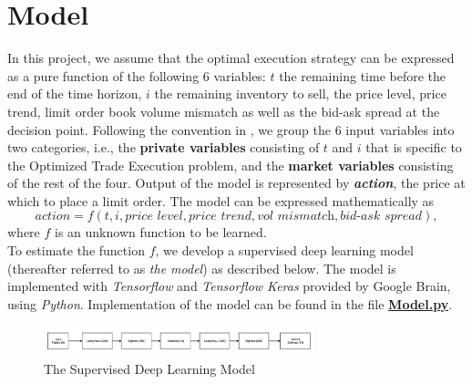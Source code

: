 \documentclass[12pt]{extarticle}
\begin{document}
\section{Model}
In this project, we assume that the optimal execution strategy can be expressed as
a pure function of the following 6 variables: $t$ the remaining time before the end of
the time horizon, $i$ the remaining inventory to sell, the price level, price trend,
limit order book volume mismatch as well as the bid-ask spread at the decision point.
Following the convention in \cite{reinforcement}, we group the 6 input variables
into two categories, i.e., the \textbf{private variables} consisting of $t$ and $i$
that is specific to the Optimized Trade Execution problem, and the \textbf{market variables}
consisting of the rest of the four. Output of the model is represented by \textit{\textbf{action}},
the price at which to place a limit order.
The model can be expressed mathematically as
$$ \textit{action} = f(t, i, \textit{price level}, \textit{price trend}, \textit{vol mismatch}, \textit{bid-ask spread}), $$
where $f$ is an unknown function to be learned. \\


\noindent To estimate the function $f$, we develop a supervised deep learning model (thereafter referred to as \textit{the model}) as described below.
The model is implemented with \textit{Tensorflow} and \textit{Tensorflow
Keras} provided by Google Brain, using \textit{Python}.
Implementation of the model can be found in the file \href{https://github.com/wangkunzhen/Machine-Learning-5225/blob/master/Model.py}{\textbf{Model.py}}.
\begin{figure}[h]
\centering
\includegraphics[width=0.7\textwidth]{model}
\caption{The Supervised Deep Learning Model}
\end{figure}
\end{document}
